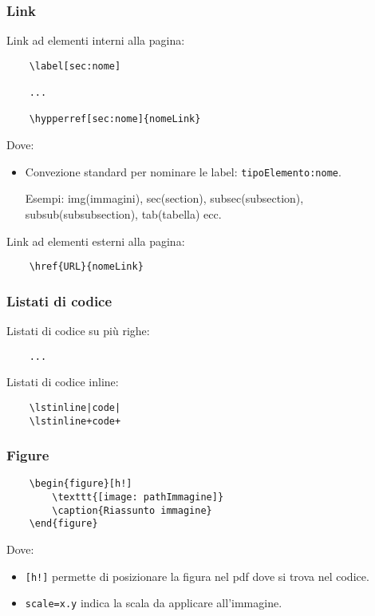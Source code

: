 \documentclass[a4paper, 12pt]{article}
\begin{document}
\subsubsection{Link}
\label{subsub:link}
Link ad elementi interni alla pagina:
\begin{lstlisting}
    \label[sec:nome]

    ... 

    \hypperref[sec:nome]{nomeLink}
\end{lstlisting}
Dove:
\begin{itemize}
    \item Convezione standard per nominare le label: \lstinline|tipoElemento:nome|.
    
    Esempi: img(immagini), sec(section), subsec(subsection), subsub(subsubsection), tab(tabella) ecc.
\end{itemize}
\noindent Link ad elementi esterni alla pagina:
\begin{lstlisting}
    \href{URL}{nomeLink}
\end{lstlisting}

\subsubsection{Listati di codice}
\label{subsub:cod}
Listati di codice su più righe:
\begin{TeXlstlisting}
\begin{lstlisting}
    ...
\end{lstlisting}
\end{TeXlstlisting}
\noindent 
Listati di codice inline:
\begin{lstlisting}
    \lstinline|code|
    \lstinline+code+
\end{lstlisting}

\subsubsection{Figure}
\label{subsub:fig}
\begin{lstlisting}
    \begin{figure}[h!]
        \texttt{[image: pathImmagine]}
        \caption{Riassunto immagine}
    \end{figure}
\end{lstlisting}
Dove:
\begin{itemize}
    \item \lstinline|[h!]| permette di posizionare la figura nel pdf dove si trova nel codice.
    \item \lstinline|scale=x.y| indica la scala da applicare all'immagine.
\end{itemize}
\end{document}
